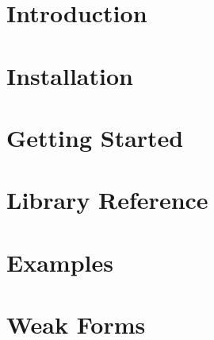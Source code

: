 \documentclass[11pt]{article}
\begin{document}


\setcounter{page}{1}
\pagestyle{plain}
\renewcommand{\thepage}{\roman{page}}
\tableofcontents
\newpage
\setcounter{page}{1}
\renewcommand{\thepage}{\arabic{page}}


\section{Introduction}
\label{ch:intro}


\section{Installation}
\label{ch:install}


\section{Getting Started}
\label{ch:getstart}

\clearpage

\newpage
\section{Library Reference}
\label{ch:libref}


\newpage
\section{Examples}
\label{ch:examples}


\newpage
\appendix
\section{Weak Forms}
\label{ch:integralforms}


\newpage


\printindex
\end{document}
